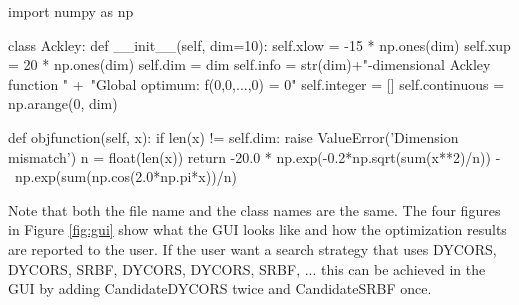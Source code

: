 \documentclass[]{article}
\begin{document}
\begin{python}
import numpy as np

class Ackley:
    def __init__(self, dim=10):
        self.xlow = -15 * np.ones(dim)
        self.xup = 20 * np.ones(dim)
        self.dim = dim
        self.info = str(dim)+"-dimensional Ackley function \n" +\
                             "Global optimum: f(0,0,...,0) = 0"
        self.integer = []
        self.continuous = np.arange(0, dim)

    def objfunction(self, x):
        if len(x) != self.dim:
            raise ValueError('Dimension mismatch')
        n = float(len(x))
        return -20.0 * np.exp(-0.2*np.sqrt(sum(x**2)/n)) - \
        		      np.exp(sum(np.cos(2.0*np.pi*x))/n)
\end{python}
Note that both the file name and the class names are the same.
\FloatBarrier
The four figures in Figure \ref{fig:gui} show what the GUI looks like and how the optimization 
results are reported to the user. If the user want a search strategy that uses DYCORS, 
DYCORS, SRBF, DYCORS, DYCORS, SRBF, ... this can be achieved in the GUI by 
adding CandidateDYCORS twice and CandidateSRBF once.
\end{document}

